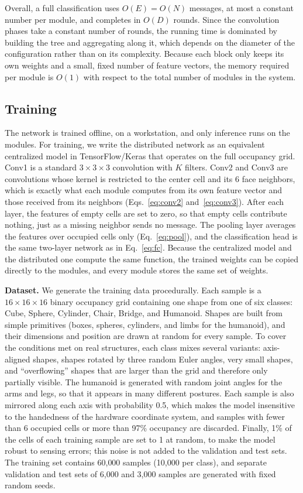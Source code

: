 \documentclass[12pt]{article}
\begin{document}
Overall, a full classification uses $O(E) = O(N)$ messages, at most a constant number per module, and completes in $O(D)$ rounds. Since the convolution phases take a constant number of rounds, the running time is dominated by building the tree and aggregating along it, which depends on the diameter of the configuration rather than on its complexity. Because each block only keeps its own weights and a small, fixed number of feature vectors, the memory required per module is $O(1)$ with respect to the total number of modules in the system.

\subsection{Training}
\label{sec:training}

The network is trained offline, on a workstation, and only inference runs on the modules. For training, we write the distributed network as an equivalent centralized model in TensorFlow/Keras that operates on the full occupancy grid. Conv1 is a standard $3\times3\times3$ convolution with $K$ filters. Conv2 and Conv3 are convolutions whose kernel is restricted to the center cell and its 6 face neighbors, which is exactly what each module computes from its own feature vector and those received from its neighbors (Eqs.~\ref{eq:conv2} and~\ref{eq:conv3}). After each layer, the features of empty cells are set to zero, so that empty cells contribute nothing, just as a missing neighbor sends no message. The pooling layer averages the features over occupied cells only (Eq.~\ref{eq:pool}), and the classification head is the same two-layer network as in Eq.~\ref{eq:fc}. Because the centralized model and the distributed one compute the same function, the trained weights can be copied directly to the modules, and every module stores the same set of weights.

\textbf{Dataset.} We generate the training data procedurally. Each sample is a $16\times16\times16$ binary occupancy grid containing one shape from one of six classes: Cube, Sphere, Cylinder, Chair, Bridge, and Humanoid. Shapes are built from simple primitives (boxes, spheres, cylinders, and limbs for the humanoid), and their dimensions and position are drawn at random for every sample. To cover the conditions met on real structures, each class mixes several variants: axis-aligned shapes, shapes rotated by three random Euler angles, very small shapes, and ``overflowing'' shapes that are larger than the grid and therefore only partially visible. The humanoid is generated with random joint angles for the arms and legs, so that it appears in many different postures. Each sample is also mirrored along each axis with probability 0.5, which makes the model insensitive to the handedness of the hardware coordinate system, and samples with fewer than 6 occupied cells or more than 97\% occupancy are discarded. Finally, 1\% of the cells of each training sample are set to 1 at random, to make the model robust to sensing errors; this noise is not added to the validation and test sets. The training set contains 60{,}000 samples (10{,}000 per class), and separate validation and test sets of 6{,}000 and 3{,}000 samples are generated with fixed random seeds.
\end{document}
